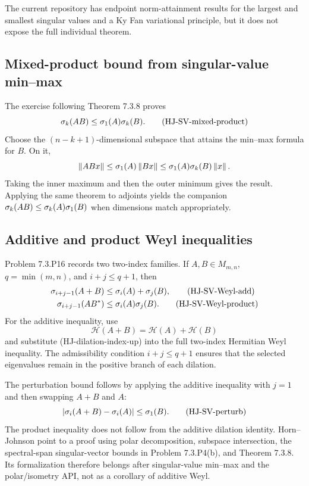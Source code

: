 The current repository has endpoint norm-attainment results for the largest and smallest singular values and a Ky Fan variational principle, but it does not expose the full individual theorem.

\subsection{Mixed-product bound from singular-value min--max}

The exercise following Theorem 7.3.8 proves
\begin{equation}
  \sigma_k(AB)\le\sigma_1(A)\sigma_k(B). \tag{HJ-SV-mixed-product}
\end{equation}
Choose the $(n-k+1)$-dimensional subspace that attains the min--max formula for $B$. On it,
\[
  \left\lVert ABx\right\rVert\le\sigma_1(A)\left\lVert Bx\right\rVert
  \le\sigma_1(A)\sigma_k(B)\left\lVert x\right\rVert.
\]
Taking the inner maximum and then the outer minimum gives the result. Applying the same theorem to adjoints yields the companion
$\sigma_k(AB)\le\sigma_k(A)\sigma_1(B)$ when dimensions match appropriately.

\subsection{Additive and product Weyl inequalities}

Problem 7.3.P16 records two two-index families. If $A,B\in M_{m,n}$, $q=\min(m,n)$, and $i+j\le q+1$, then
\begin{align}
  \sigma_{i+j-1}(A+B)&\le\sigma_i(A)+\sigma_j(B), \tag{HJ-SV-Weyl-add}\\
  \sigma_{i+j-1}(AB^*)&\le\sigma_i(A)\sigma_j(B). \tag{HJ-SV-Weyl-product}
\end{align}
For the additive inequality, use
\[
  \mathcal H(A+B)=\mathcal H(A)+\mathcal H(B)
\]
and substitute (HJ-dilation-index-up) into the full two-index Hermitian Weyl inequality. The admissibility condition $i+j\le q+1$ ensures that the selected eigenvalues remain in the positive branch of each dilation.

The perturbation bound follows by applying the additive inequality with $j=1$ and then swapping $A+B$ and $A$:
\begin{equation}
  |\sigma_i(A+B)-\sigma_i(A)|\le\sigma_1(B). \tag{HJ-SV-perturb}
\end{equation}
The product inequality does not follow from the additive dilation identity. Horn--Johnson point to a proof using polar decomposition, subspace intersection, the spectral-span singular-vector bounds in Problem 7.3.P4(b), and Theorem 7.3.8. Its formalization therefore belongs after singular-value min--max and the polar/isometry API, not as a corollary of additive Weyl.

